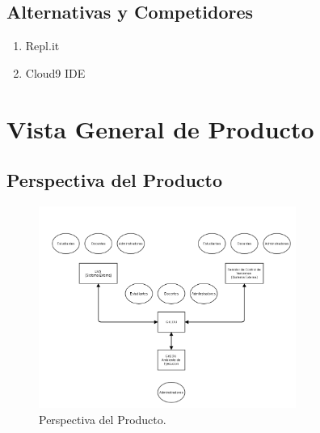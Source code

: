 \subsection{Alternativas y Competidores}
\begin{enumerate}
	\item Repl.it
    \item Cloud9 IDE
\end{enumerate}

\pagebreak

\section{Vista General de Producto}
\subsection{Perspectiva del Producto}
\begin{figure}[h!]
  \begin{center}
    \includegraphics[width=0.75\textwidth]{Figures/pers-prod.png}
  \end{center}
  \caption{Perspectiva del Producto.}
  \label{pers-prod}
\end{figure}


